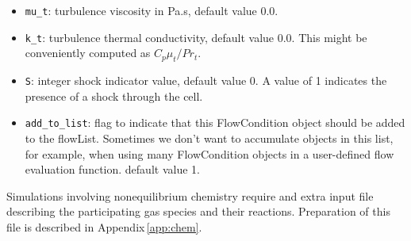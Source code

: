 \begin{itemize}
  \item \texttt{mu\_t}: turbulence viscosity in Pa.s, default value 0.0.
  \item \texttt{k\_t}: turbulence thermal conductivity, default value 0.0.
     This might be conveniently computed as $C_p \mu_t / Pr_t$.
  \item \texttt{S}: integer shock indicator value, default value 0.
    A value of 1 indicates the presence of a shock through the cell.
  \item \texttt{add\_to\_list}: flag to indicate that this FlowCondition object 
    should be added to the flowList.  Sometimes we don't want
    to accumulate objects in this list, for example, when using
    many FlowCondition objects in a user-defined flow evaluation function.
    default value 1.
\end{itemize}

\medskip
Simulations involving nonequilibrium chemistry require and extra input file
describing the participating gas species and their reactions.
Preparation of this file is described in Appendix\,\ref{app:chem}.

